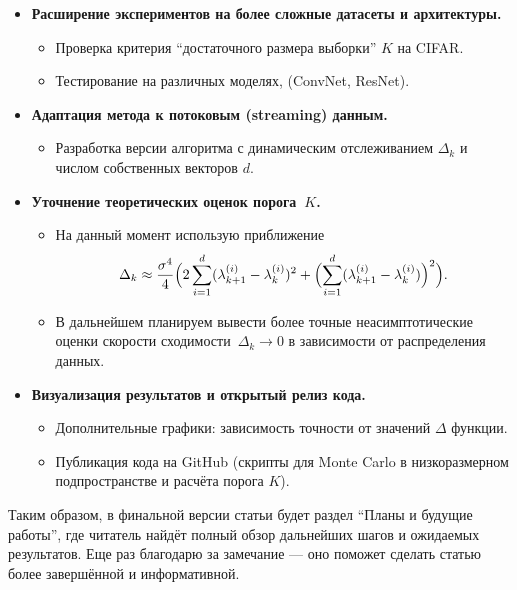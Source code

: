 \documentclass[11pt]{article}
\begin{document}
\begin{itemize}
    \item \textbf{Расширение экспериментов на более сложные датасеты и архитектуры.}
          \begin{itemize}
              \item Проверка критерия ``достаточного размера выборки'' $K$ на CIFAR.
              \item Тестирование на различных моделях, (ConvNet, ResNet).
          \end{itemize}

    \item \textbf{Адаптация метода к потоковым (streaming) данным.}
          \begin{itemize}
              \item Разработка версии алгоритма с динамическим отслеживанием $\Delta_k$ и числом собственных векторов $d$.
          \end{itemize}

    \item \textbf{Уточнение теоретических оценок порога~$K$.}
          \begin{itemize}
              \item На данный момент использую приближение
                    $$\Delta_k \approx \frac{\sigma^4}{4}\Bigl(2\sum_{i=1}^d(\lambda^{(i)}_{k+1}-\lambda^{(i)}_k)^2
                        +\Bigl(\sum_{i=1}^d(\lambda^{(i)}_{k+1}-\lambda^{(i)}_k)\Bigr)^2\Bigr).$$
              \item В дальнейшем планируем вывести более точные неасимптотические оценки скорости сходимости~$\Delta_k\to0$ в
                    зависимости от распределения данных.
          \end{itemize}

    \item \textbf{Визуализация результатов и открытый релиз кода.}
          \begin{itemize}
              \item Дополнительные графики: зависимость точности от значений $\Delta$ функции.
              \item Публикация кода на GitHub (скрипты для Monte Carlo в низкоразмерном подпространстве и расчёта порога $K$).
          \end{itemize}
\end{itemize}

Таким образом, в финальной версии статьи будет раздел ``Планы и будущие работы'', где читатель найдёт полный обзор дальнейших
шагов и ожидаемых результатов. Еще раз благодарю за замечание  --- оно поможет сделать статью более завершённой и
информативной.
\end{document}

